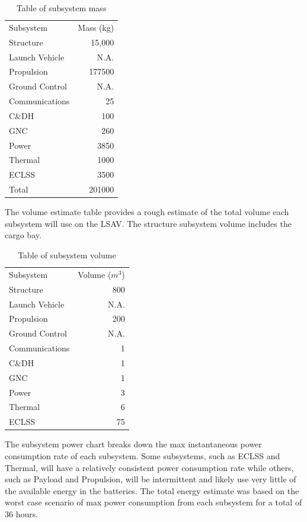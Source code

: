 \documentclass[10pt]{article}
\begin{document}
\begin{table}[H]
  \centering
  \caption{Table of subsystem mass}
  \label{table:mass_summary}
  \begin{tabular}{lr} \hline
    Subsystem & Mass (kg) \\ 
    Structure & 15,000 \\ 
    Launch Vehicle & N.A. \\ 
    Propulsion & 177500 \\
    Ground Control & N.A. \\
    Communications & 25 \\
    C\&DH & 100 \\
    GNC & 260 \\
    Power & 3850\\
    Thermal & 1000 \\
    ECLSS & 3500 \\ 
    Total & 201000 \\ 
  \end{tabular}
\end{table}

The volume estimate table provides a rough estimate of the total
volume each subsystem will use on the LSAV. The structure subsystem
volume includes the cargo bay.

\begin{table}[H]
  \centering
  \caption{Table of subsystem volume}
  \label{table:volume_summary}
  \begin{tabular}{lr} \hline
    Subsystem & Volume ($m^3$) \\ 
    Structure & 800 \\ 
    Launch Vehicle & N.A. \\ 
    Propulsion & 200 \\
    Ground Control & N.A. \\
    Communications & 1 \\
    C\&DH & 1 \\
    GNC & 1 \\
    Power & 3 \\
    Thermal & 6 \\
    ECLSS & 75 \\  
  \end{tabular}
\end{table}

The subsystem power chart breaks down the max instantaneous power
consumption rate of each subsystem. Some subsystems, such as ECLSS and
Thermal, will have a relatively consistent power consumption rate
while others, such as Payload and Propulsion, will be intermittent and
likely use very little of the available energy in the batteries. The
total energy estimate was based on the worst case scenario of max
power consumption from each subsystem for a total of 36 hours.
\end{document}
